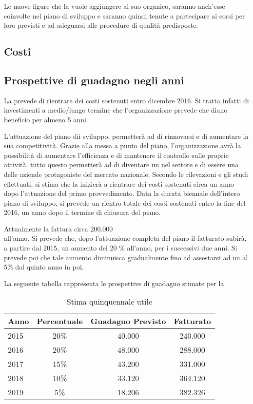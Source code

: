 Le nuove figure che la \customer vuole aggiungere al suo organico, saranno anch'esse coinvolte nel piano di sviluppo e saranno quindi tenute a partecipare ai corsi per loro previsti e ad adeguarsi alle procedure di qualità predisposte.

\subsection{Costi}
\subsection{ Prospettive di guadagno negli anni}
La \customer prevede di rientrare dei costi sostenuti entro dicembre 2016. Si tratta infatti di investimenti a medio/lungo termine che l'organizzazione prevede che diano beneficio per almeno 5 anni.

L'attuazione del piano dii sviluppo, permetterà ad  \customer di rinnovarsi e di aumentare la sua competitività. Grazie alla messa a punto del piano, l'organizzazione avrà la possibilità di aumentare l'efficienza e di mantenere il controllo sulle proprie attività. tutto questo permetterà ad \customer di diventare un  nel settore e di essere una delle aziende protagoniste del mercato nazionale. 
Secondo le rilevazioni e gli studi effettuati, si stima che la \customer inizierà a rientrare dei costi sostenuti circa un anno dopo l'attuazione del primo provvedimento. Data la durata biennale dell'intero piano di sviluppo, si prevede un rientro totale dei costi sostenuti entro la fine del 2016, un anno dopo il termine di chiusura del piano.

Attualmente la \customer fattura circa 200.000 \text{\euro} \\ all'anno. Si prevede che, dopo l'attuazione completa del piano il fatturato subirà, a partire dal 2015, un aumento del 20 \% all'anno, per i successivi due anni. Si prevede poi che tale aumento diminuisca gradualmente fino ad assestarsi ad un al 5\% dal quinto anno in poi.
 
La seguente tabella rappresenta le prospettive di guadagno stimate per la \customer

\begin{table}[H]
\centering
\begin{tabular}{|p{}|c|c|c|}
\hline 

\textbf{ Anno} &  \textbf{Percentuale} &\textbf{Guadagno Previsto}& \textbf{Fatturato}\\
\hline
 2015 & 20\% & \text{\euro} 40.000 &\text{\euro} 240.000 \\
 2016 & 20\% & \text{\euro} 48.000 & \text{\euro} 288.000 \\
 2017 & 15\% & \text{\euro} 43.200 & \text{\euro} 331.000\\
 2018 & 10\% & \text{\euro} 33.120 & \text{\euro} 364.120\\
 2019 & 5\% & \text{\euro} 18.206 &  \text{\euro} 382.326\\
\hline

\end{tabular}
\caption{Stima quinquennale utile }\label{tab:utile}
\end{table}


